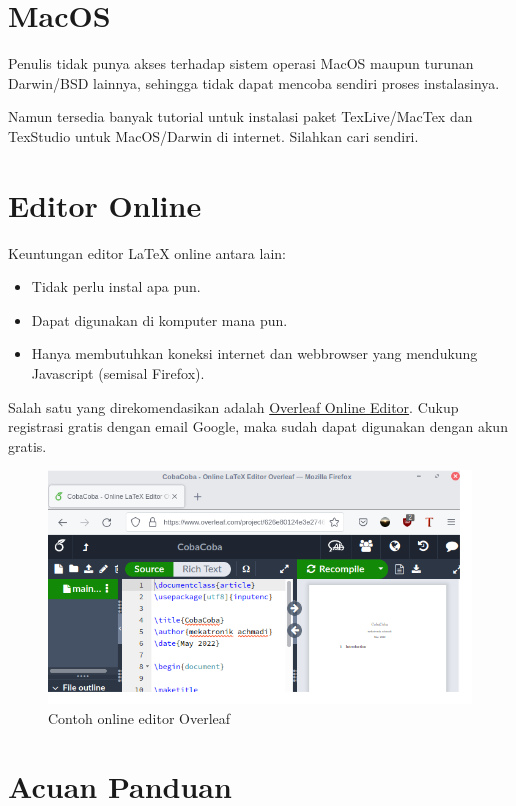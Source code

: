 \documentclass{book} %
\begin{document}
	\section{MacOS}

	Penulis tidak punya akses terhadap sistem operasi MacOS maupun turunan Darwin/BSD lainnya,
	sehingga tidak dapat mencoba sendiri proses instalasinya.

	Namun tersedia banyak tutorial untuk instalasi paket TexLive/MacTex dan TexStudio untuk MacOS/Darwin di internet.
	Silahkan cari sendiri.

	\section{Editor Online}

	Keuntungan editor \LaTeX{} online antara lain:
	\begin{itemize}
		\item Tidak perlu instal apa pun.
		\item Dapat digunakan di komputer mana pun.
		\item Hanya membutuhkan koneksi internet dan webbrowser yang mendukung Javascript (semisal Firefox).
	\end{itemize}

	Salah satu yang direkomendasikan adalah \href{https://www.overleaf.com/project}{Overleaf Online Editor}.
	Cukup registrasi gratis dengan email Google, maka sudah dapat digunakan dengan akun gratis.

	\begin{figure}[!ht]
		\centering
		\includegraphics[width=400pt]{images/overleaf}
		\caption{Contoh online editor Overleaf}
	\end{figure}

	\section{Acuan Panduan}
\end{document}
